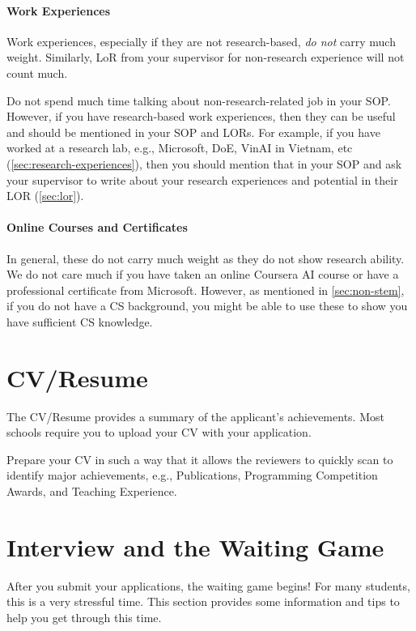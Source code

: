 \documentclass[oneside,11pt,dvipsnames]{book}
\begin{document}
\paragraph{Work Experiences} Work experiences, especially if they are not research-based, \emph{do not} carry much weight. Similarly, LoR from your supervisor for non-research experience will not count much.

Do not spend much time talking about non-research-related job in your SOP.
However, if you have research-based work experiences, then they can be useful and should be mentioned in your SOP and LORs. For example, if you have worked at a research lab, e.g., Microsoft, DoE, VinAI in Vietnam, etc (\autoref{sec:research-experiences}), then you should mention that in your SOP and ask your supervisor to write about your research experiences and potential in their LOR (\autoref{sec:lor}).

\paragraph{Online Courses and Certificates}
In general, these do not carry much weight as they do not show research ability. We do not care much if you have taken an online Coursera AI course or have a professional certificate from Microsoft.
However, as mentioned in \autoref{sec:non-stem}, if you do not have a CS background, you might be able to use these to show you have sufficient CS knowledge.

\section{CV/Resume}
The CV/Resume provides a summary of the applicant's achievements. Most schools require you to upload your CV with your application.

Prepare your CV in such a way that it allows the reviewers to quickly scan to identify major achievements, e.g., Publications, Programming Competition Awards, and Teaching Experience.

\section{Interview and the Waiting Game}\label{sec:interview}

After you submit your applications, the waiting game begins! For many students, this is a very stressful time. This section provides some information and tips to help you get through this time.
\end{document}
